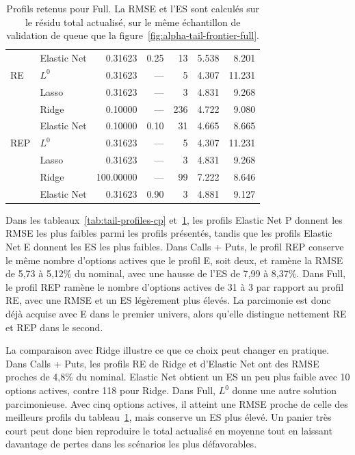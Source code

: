 \documentclass[12pt,a4paper]{article}
\newcommand{\1}{\mathbf{1}}
\begin{document}
\begin{minipage}{\linewidth}
\begin{table}[H]
\begin{tabular}{llrrrrr}
 & Elastic Net & 0.31623 & 0.25 & 13 & 5.538 & 8.201 \\
\addlinespace[2pt]
RE & $L^0$ & 0.31623 & --- & 5 & 4.307 & 11.231 \\
 & Lasso & 0.31623 & --- & 3 & 4.831 & 9.268 \\
 & Ridge & 0.10000 & --- & 236 & 4.722 & 9.080 \\
 & Elastic Net & 0.10000 & 0.10 & 31 & 4.665 & 8.665 \\
\addlinespace[2pt]
REP & $L^0$ & 0.31623 & --- & 5 & 4.307 & 11.231 \\
 & Lasso & 0.31623 & --- & 3 & 4.831 & 9.268 \\
 & Ridge & 100.00000 & --- & 99 & 7.222 & 8.646 \\
 & Elastic Net & 0.31623 & 0.90 & 3 & 4.881 & 9.127 \\
\bottomrule
\end{tabular}
\caption{Profils retenus pour Full. La RMSE et l’ES sont calculés sur le résidu total actualisé, sur le même échantillon de validation de queue que la figure~\ref{fig:alpha-tail-frontier-full}.}
\label{tab:tail-profiles-full}
\end{table}
\end{minipage}\par

Dans les tableaux~\ref{tab:tail-profiles-cp} et~\ref{tab:tail-profiles-full}, les profils Elastic Net P donnent les RMSE les plus faibles parmi les profils présentés, tandis que les profils Elastic Net E donnent les ES les plus faibles. Dans Calls + Puts, le profil REP conserve le même nombre d’options actives que le profil E, soit deux, et ramène la RMSE de 5,73 à 5,12\% du nominal, avec une hausse de l’ES de 7,99 à 8,37\%. Dans Full, le profil REP ramène le nombre d’options actives de 31 à 3 par rapport au profil RE, avec une RMSE et un ES légèrement plus élevés. La parcimonie est donc déjà acquise avec E dans le premier univers, alors qu’elle distingue nettement RE et REP dans le second.

La comparaison avec Ridge illustre ce que ce choix peut changer en pratique. Dans Calls + Puts, les profils RE de Ridge et d’Elastic Net ont des RMSE proches de 4,8\% du nominal. Elastic Net obtient un ES un peu plus faible avec 10 options actives, contre 118 pour Ridge. Dans Full, $L^0$ donne une autre solution parcimonieuse. Avec cinq options actives, il atteint une RMSE proche de celle des meilleurs profils du tableau~\ref{tab:tail-profiles-full}, mais conserve un ES plus élevé. Un panier très court peut donc bien reproduire le total actualisé en moyenne tout en laissant davantage de pertes dans les scénarios les plus défavorables.
\end{document}
